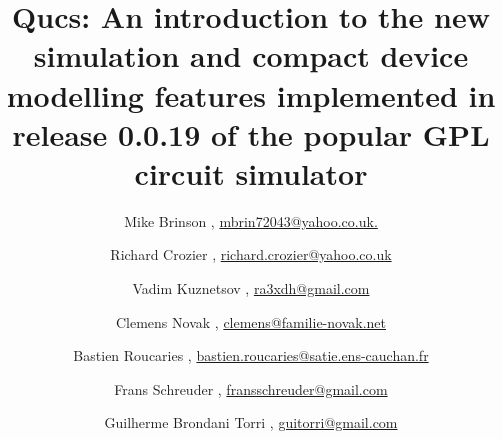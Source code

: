 \documentclass[9pt]{beamer}
\begin{document}
\usetikzlibrary{patterns}
\usetikzlibrary{circuits}
\usetikzlibrary{circuits.ee}
\usetikzlibrary{circuits.ee.IEC} 
\usetikzlibrary{decorations.pathmorphing,patterns}

\begin{frame}

\title{Qucs: An introduction to the new simulation and compact device modelling 
features implemented in release 0.0.19 of the popular GPL circuit simulator}

\author{ \small
Mike Brinson , \url{mbrin72043@yahoo.co.uk.} \\ \and 
Richard Crozier ,  \url{richard.crozier@yahoo.co.uk} \\ \and 
Vadim Kuznetsov , \url{ra3xdh@gmail.com} \\ \and 
Clemens Novak , \url{clemens@familie-novak.net} \\ \and 
Bastien Roucaries , \url{bastien.roucaries@satie.ens-cauchan.fr} \\ 
\and Frans Schreuder , \url{fransschreuder@gmail.com} \\ \and 
Guilherme Brondani Torri , \url{guitorri@gmail.com} }


\maketitle

\end{frame}
\end{document}
